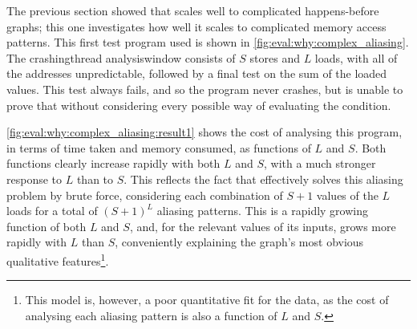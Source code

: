 \noindent
The previous section showed that {\technique} scales well to
complicated happens-before graphs; this one investigates how well it
scales to complicated memory access patterns.  This first test program
used is shown in \autoref{fig:eval:why:complex_aliasing}.  The
\gls{crashingthread} \gls{analysiswindow} consists of $S$ stores and
$L$ loads, with all of the addresses unpredictable, followed by a
final test on the sum of the loaded values.  This test always fails,
and so the program never crashes, but {\technique} is unable to prove
that without considering every possible way of evaluating the
condition.

\autoref{fig:eval:why:complex_aliasing:result1} shows the cost of
analysing this program, in terms of time taken and memory consumed, as
functions of $L$ and $S$.  Both functions clearly increase rapidly
with both $L$ and $S$, with a much stronger response to $L$ than to
$S$.  This reflects the fact that {\technique} effectively solves this
aliasing problem by brute force, considering each combination of $S+1$
values of the $L$ loads for a total of $(S+1)^L$ aliasing patterns.
This is a rapidly growing function of both $L$ and $S$, and, for the
relevant values of its inputs, grows more rapidly with $L$ than $S$,
conveniently explaining the graph's most obvious qualitative
features\footnote{This model is, however, a poor quantitative fit for
  the data, as the cost of analysing each aliasing pattern is also a
  function of $L$ and $S$.}\!\!.

